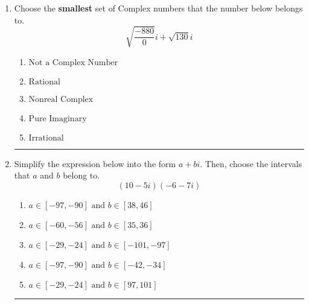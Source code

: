 \documentclass[14pt]{extbook}
\newcommand{\litem}[1]{\item#1\hspace*{-1cm}\rule{\textwidth}{0.4pt}}
\begin{document}
\begin{enumerate}
{\begin{enumerate}[label=\Alph*.]
\end{enumerate} }
\litem{
Choose the \textbf{smallest} set of Complex numbers that the number below belongs to.\[ \sqrt{\frac{-880}{0}} i+\sqrt{130}i \]\begin{enumerate}[label=\Alph*.]
\item \( \text{Not a Complex Number} \)
\item \( \text{Rational} \)
\item \( \text{Nonreal Complex} \)
\item \( \text{Pure Imaginary} \)
\item \( \text{Irrational} \)

\end{enumerate} }
\litem{
Simplify the expression below into the form $a+bi$. Then, choose the intervals that $a$ and $b$ belong to.\[ (10 - 5 i)(-6 - 7 i) \]\begin{enumerate}[label=\Alph*.]
\item \( a \in [-97, -90] \text{ and } b \in [38, 46] \)
\item \( a \in [-60, -56] \text{ and } b \in [35, 36] \)
\item \( a \in [-29, -24] \text{ and } b \in [-101, -97] \)
\item \( a \in [-97, -90] \text{ and } b \in [-42, -34] \)
\item \( a \in [-29, -24] \text{ and } b \in [97, 101] \)

\end{enumerate} }
\end{enumerate}
\end{document}
